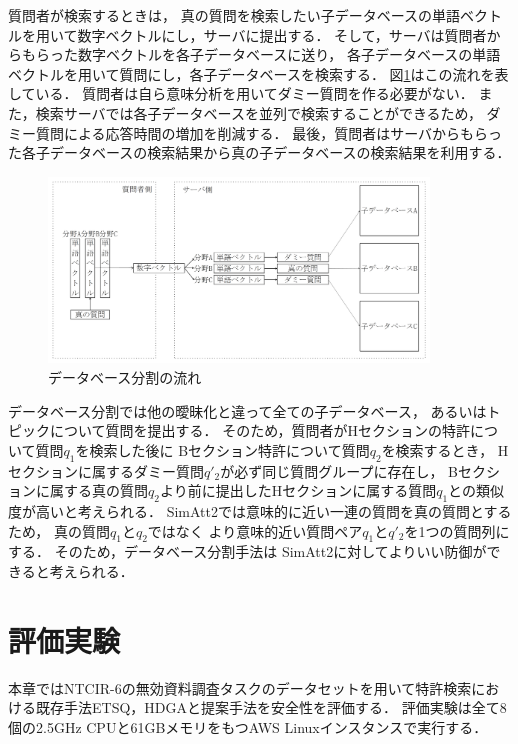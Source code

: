 \documentclass[master]{suribt}
\theoremstyle{definition}
\begin{document}
 質問者が検索するときは，
 真の質問を検索したい子データベースの単語ベクトルを用いて数字ベクトルにし，サーバに提出する．
 そして，サーバは質問者からもらった数字ベクトルを各子データベースに送り，
 各子データベースの単語ベクトルを用いて質問にし，各子データベースを検索する．
 図\ref{fig:dbb}はこの流れを表している．
 質問者は自ら意味分析を用いてダミー質問を作る必要がない．
 また，検索サーバでは各子データベースを並列で検索することができるため，
 ダミー質問による応答時間の増加を削減する． 
 最後，質問者はサーバからもらった各子データベースの検索結果から真の子データベースの検索結果を利用する．
 
 \begin{figure}
 \includegraphics[width=0.9\textwidth,natwidth=997,natheight=476]{dbb.pdf}
 \caption{データベース分割の流れ}
 \label{fig:dbb}
 \end{figure}
 
 データベース分割では他の曖昧化と違って全ての子データベース，
 あるいはトピックについて質問を提出する．
 そのため，質問者がHセクションの特許について質問$q_1$を検索した後に
 Bセクション特許について質問$q_2$を検索するとき，
 Hセクションに属するダミー質問$q'_2$が必ず同じ質問グループに存在し，
 Bセクションに属する真の質問$q_2$より前に提出したHセクションに属する質問$q_1$との類似度が高いと考えられる．
 SimAtt2では意味的に近い一連の質問を真の質問とするため，
 真の質問$q_1$と$q_2$ではなく
 より意味的近い質問ペア$q_1$と$q'_2$を1つの質問列にする．
 そのため，データベース分割手法は
 SimAtt2に対してよりいい防御ができると考えられる．

 \chapter{評価実験} \label{s:ex}
 本章ではNTCIR-6\cite{NTCIR6}の無効資料調査タスクのデータセットを用いて特許検索における既存手法ETSQ，HDGAと提案手法を安全性を評価する．
 評価実験は全て8個の2.5GHz CPUと61GBメモリをもつAWS Linuxインスタンスで実行する．
\end{document}

